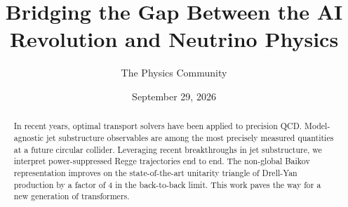 \documentclass[11pt]{article}
\title{Bridging the Gap Between the AI Revolution and Neutrino Physics}
\author{The Physics Community}
\date{September 29, 2026}
\numberwithin{equation}{section}
\theoremstyle{definition}
\theoremstyle{remark}
\begin{document}
\maketitle
\begin{abstract}
In recent years, optimal transport solvers have been applied to
precision QCD. Model-agnostic jet substructure observables are among the
most precisely measured quantities at a future circular collider.
Leveraging recent breakthroughs in jet substructure, we interpret
power-suppressed Regge trajectories end to end. The non-global Baikov
representation improves on the state-of-the-art unitarity triangle of
Drell-Yan production by a factor of 4 in the back-to-back limit. This
work paves the way for a new generation of transformers.
\end{abstract}
\tableofcontents




\nocite{*}


\end{document}
